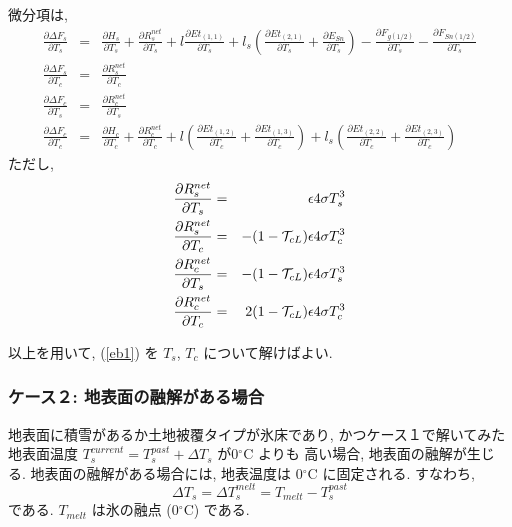 微分項は, 
\begin{eqnarray}
 \frac{\partial \Delta F_s}{\partial T_s} &=&
 \frac{\partial H_s}{\partial T_s} 
+\frac{\partial R^{net}_s}{\partial T_s}
+l\frac{\partial Et_{(1,1)}}{\partial T_s}
+l_s\left(\frac{\partial Et_{(2,1)}}{\partial T_s}
+    \frac{\partial E_{Sn}}{\partial T_s}\right)
-\frac{\partial F_{g(1/2)}}{\partial T_s}
-\frac{\partial F_{Sn(1/2)}}{\partial T_s} \\
 \frac{\partial \Delta F_s}{\partial T_c} &=&
 \frac{\partial R^{net}_s}{\partial T_c} \\
 \frac{\partial \Delta F_c}{\partial T_s} &=&
 \frac{\partial R^{net}_c}{\partial T_s} \\
 \frac{\partial \Delta F_c}{\partial T_c} &=&
 \frac{\partial H_c}{\partial T_c} 
+\frac{\partial R^{net}_c}{\partial T_c}
+l  \left(\frac{\partial Et_{(1,2)}}{\partial T_c}
+         \frac{\partial Et_{(1,3)}}{\partial T_c}\right)
+l_s\left(\frac{\partial Et_{(2,2)}}{\partial T_c}
+         \frac{\partial Et_{(2,3)}}{\partial T_c}\right)
\end{eqnarray}
ただし, 
\begin{eqnarray}
 \frac{\partial R^{net}_s}{\partial T_s} &=&
 \epsilon 4 \sigma T_s^3 \\
 \frac{\partial R^{net}_s}{\partial T_c} &=&
 - ( 1 - {\cal{T}}_{cL} ) \epsilon 4 \sigma T_c^3 \\
 \frac{\partial R^{net}_c}{\partial T_s} &=&
 - ( 1 - {\cal{T}}_{cL} ) \epsilon 4 \sigma T_s^3 \\
 \frac{\partial R^{net}_c}{\partial T_c} &=&
  2( 1 - {\cal{T}}_{cL} ) \epsilon 4 \sigma T_c^3 
\end{eqnarray}

以上を用いて, (\ref{eb1}) を $T_s$, $T_c$ について解けばよい. 

\subsubsection{ケース２: 地表面の融解がある場合}

地表面に積雪があるか土地被覆タイプが氷床であり, かつケース１で解いてみた
地表面温度 $T_s^{current} = T_s^{past}+\Delta T_s$ が0$^{\circ}$C よりも
高い場合, 地表面の融解が生じる. 
地表面の融解がある場合には, 地表温度は 0$^{\circ}$C に固定される. 
すなわち, 
\begin{equation}
 \Delta T_s = \Delta T_s^{melt} = T_{melt} - T_s^{past}
\end{equation}
である. $T_{melt}$ は氷の融点 (0$^{\circ}$C) である. 

